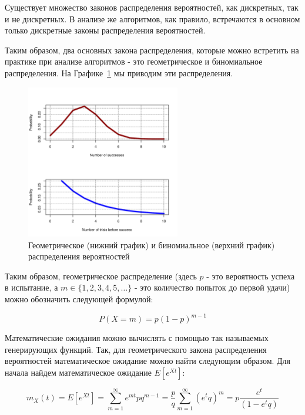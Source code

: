 Существует множество законов распределения вероятностей, как дискретных, 
так и не дискретных. В анализе же алгоритмов, как правило, встречаются
в основном только дискретные законы распределения вероятностей.

Таким образом, два основных закона распределения, которые можно встретить на практике
при анализе алгоритмов - это геометрическое и биномиальное распределения.
На Графике~\ref{fig:distributions} мы приводим эти распределения.

\begin{figure}[ht!]
\centering
\includegraphics[width=0.6\textwidth]{graphics/distributions.pdf}
\caption{Геометрическое (нижний график) и биномиальное (верхний график) распределения вероятностей}
\label{fig:distributions}
\end{figure}

Таким образом, геометрическое распределение (здесь $p$ - это 
вероятность успеха в испытание, а $m \in \{1, 2, 3, 4, 5, \ldots\}$ - это 
количество попыток до первой удачи) можно обозначить следующей 
формулой:

$$P(X=m)=p(1-p)^{m-1}$$

Математические ожидания можно вычислять с помощью так называемых 
генерирующих функций. Так, для геометрического закона распределения 
вероятностей математическое ожидание можно найти следующим образом.
Для начала найдем математическое ожидание $E[e^{Xt}]$:


$$m_X(t) = E[e^{Xt}] = \sum_{m=1}^{\infty} e^{mt}pq^{m-1} = 
\frac{p}{q}\sum_{m=1}^{\infty} (e^{t}q)^{m} = p\frac{e^t}{(1-e^tq)}$$

